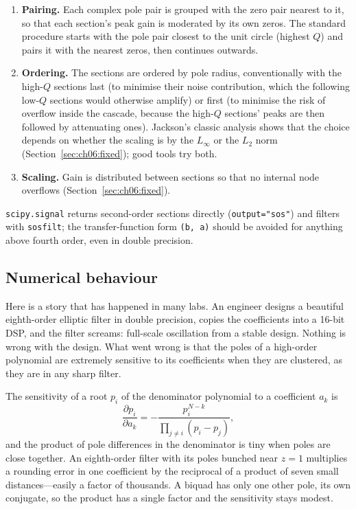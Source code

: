 \begin{enumerate}
\item \textbf{Pairing.} Each complex pole pair is grouped with the zero pair nearest to it, so that
each section's peak gain is moderated by its own zeros. The standard procedure starts with the pole
pair closest to the unit circle (highest $Q$) and pairs it with the nearest zeros, then continues
outwards.
\item \textbf{Ordering.} The sections are ordered by pole radius, conventionally with the
high-$Q$ sections last (to minimise their noise contribution, which the following low-$Q$
sections would otherwise amplify) or first (to minimise the risk of overflow inside the cascade,
because the high-$Q$ sections' peaks are then followed by attenuating ones). Jackson's classic
analysis shows that the choice depends on whether the scaling is by the $L_\infty$ or the $L_2$
norm (Section~\ref{sec:ch06:fixed}); good tools try both.
\item \textbf{Scaling.} Gain is distributed between sections so that no internal node overflows
(Section~\ref{sec:ch06:fixed}).
\end{enumerate}
\texttt{scipy.signal} returns second-order sections directly (\texttt{output="sos"}) and filters
with \texttt{sosfilt}; the transfer-function form \texttt{(b, a)} should be avoided for anything
above fourth order, even in double precision.

\subsection{Numerical behaviour}
\label{sec:ch06:iirnum}

Here is a story that has happened in many labs. An engineer designs a beautiful eighth-order
elliptic filter in double precision, copies the coefficients into a 16-bit DSP, and the filter
screams: full-scale oscillation from a stable design. Nothing is wrong with the design. What
went wrong is that the poles of a high-order polynomial are extremely sensitive to its
coefficients when they are clustered, as they are in any sharp filter.


\begin{deeper}
The sensitivity of a root $p_i$ of the denominator polynomial to a coefficient $a_k$ is
\begin{equation}
\frac{\partial p_i}{\partial a_k}=-\frac{p_i^{N-k}}{\prod_{j\ne i}(p_i-p_j)},
\end{equation}
and the product of pole differences in the denominator is tiny when poles are close together. An
eighth-order filter with its poles bunched near $z=1$ multiplies a rounding error in one
coefficient by the reciprocal of a product of seven small distances---easily a factor of thousands.
A biquad has only one other pole, its own conjugate, so the product has a single factor and the
sensitivity stays modest.
\end{deeper}


